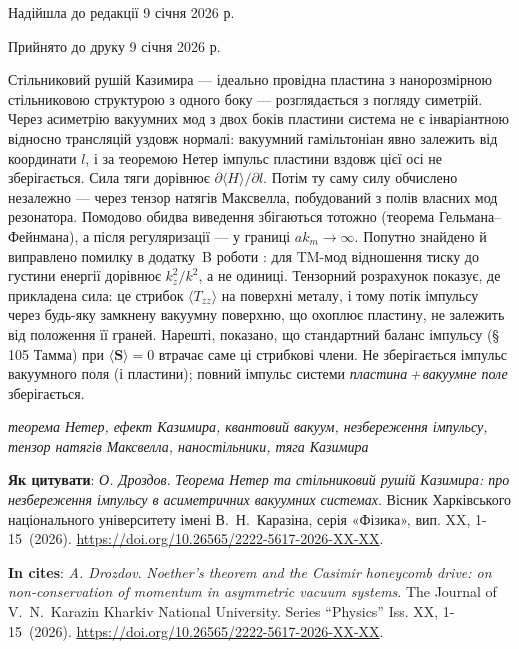 \documentclass[twoside, 10pt]{article}
\def\myfirstpage{1}
\def\mylastpage{15}
\def\mypages{\myfirstpage-\mylastpage}
\def\mynameukr{О. Дроздов}
\def\mytitleukr{Теорема Нетер та стільниковий рушій Казимира: про незбереження імпульсу в асиметричних вакуумних системах}
\def\mydoi{10.26565/2222-5617-2026-XX-XX} %
\def\ukrvisnyk{Вісник Харківського національного університету імені В.~Н.~Каразіна, серія «Фізика», вип. XX, \mypages~(2026)}
\def\envisnyk{The Journal of V.~N.~Karazin Kharkiv National University. Series “Physics” Iss. XX, \mypages~(2026)}
\def\mynameen{A. Drozdov}
\def\mytitleen{Noether's theorem and the Casimir honeycomb drive: on non-conservation of momentum in asymmetric vacuum systems}
\def\myreceived{Надійшла до редакції 9 січня 2026 р.}
\def\myaccepted{Прийнято до друку 9 січня 2026 р.}
\begin{document}
\vspace{5mm}
\centerline{\myreceived}
\centerline{\myaccepted}

\vspace{5mm}

Стільниковий рушій Казимира \cite{Drozdov2024} --- ідеально провідна пластина з нанорозмірною
стільниковою структурою з одного боку --- розглядається з погляду симетрій. Через асиметрію
вакуумних мод з двох боків пластини система не є інваріантною відносно трансляцій уздовж нормалі:
вакуумний гамільтоніан явно залежить від координати \(l\), і за теоремою Нетер імпульс пластини вздовж
цієї осі не зберігається. Сила тяги дорівнює \(\partial\langle H\rangle/\partial l\). Потім ту саму
силу обчислено незалежно --- через тензор натягів Максвелла, побудований з полів власних мод
резонатора. Помодово обидва виведення збігаються тотожно (теорема Гельмана--Фейнмана), а після
регуляризації --- у границі \(ak_m\to\infty\). Попутно знайдено й виправлено помилку в додатку~B
роботи \cite{Drozdov2024}: для TM-мод відношення тиску до густини енергії дорівнює \(k_z^2/k^2\),
а не одиниці. Тензорний розрахунок показує, де прикладена сила: це стрибок \(\langle T_{zz}\rangle\)
на поверхні металу, і тому потік імпульсу через будь-яку замкнену вакуумну поверхню, що охоплює
пластину, не залежить від положення її граней. Нарешті, показано, що стандартний баланс імпульсу
(\S\,105 Тамма) при \(\langle\mathbf S\rangle=0\) втрачає саме ці стрибкові члени. Не зберігається імпульс вакуумного поля (і пластини); повний імпульс системи \emph{пластина\,+\,вакуумне поле} зберігається.

\vspace{5mm}

\noindent
\begin{keywords}
\textit{теорема Нетер, ефект Казимира, квантовий вакуум, незбереження імпульсу, тензор натягів Максвелла, наностільники, тяга Казимира}
\end{keywords}

\vspace{5mm}

\noindent
\textbf{Як цитувати}: \textit{\mynameukr}. \textit{\mytitleukr}. {\ukrvisnyk}. \href{https://doi.org/\mydoi} {https://doi.org/\mydoi}.

\vspace{5mm}

\noindent
\textbf{In cites}: \textit{\mynameen}. \textit{\mytitleen}. {\envisnyk}. \href{https://doi.org/\mydoi} {https://doi.org/\mydoi}.

\vspace{5mm}
\end{document}

